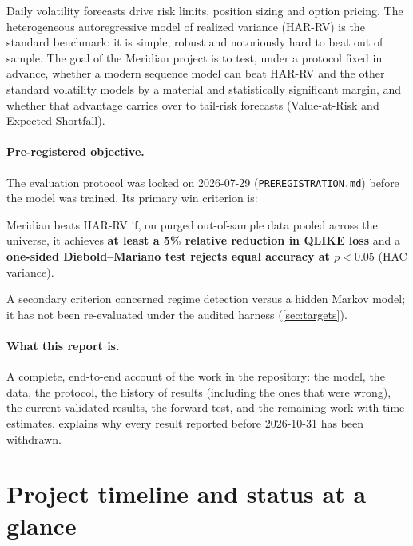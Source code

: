 \documentclass[11pt,a4paper]{article}
\begin{document}
Daily volatility forecasts drive risk limits, position sizing and option pricing. The
heterogeneous autoregressive model of realized variance (HAR-RV) \cite{corsi2009} is the standard
benchmark: it is simple, robust and notoriously hard to beat out of sample. The goal of the Meridian
project is to test, under a protocol fixed in advance, whether a modern sequence model can beat
HAR-RV and the other standard volatility models by a material and statistically significant margin,
and whether that advantage carries over to tail-risk forecasts (Value-at-Risk and Expected Shortfall).

\paragraph{Pre-registered objective.} The evaluation protocol was locked on 2026-07-29
(\texttt{PREREGISTRATION.md}) before the model was trained. Its primary win criterion is:
\begin{keybox}
Meridian beats HAR-RV if, on purged out-of-sample data pooled across the universe, it achieves
\textbf{at least a 5\% relative reduction in QLIKE loss} and a \textbf{one-sided Diebold--Mariano test
rejects equal accuracy at $p<0.05$} (HAC variance).
\end{keybox}
A secondary criterion concerned regime detection versus a hidden Markov model; it has not been
re-evaluated under the audited harness (\cref{sec:targets}).

\paragraph{What this report is.} A complete, end-to-end account of the work in the repository: the
model, the data, the protocol, the history of results (including the ones that were wrong), the
current validated results, the forward test, and the remaining work with time estimates.
 explains why every result reported before 2026-10-31 has been withdrawn.

\section{Project timeline and status at a glance}\label{sec:timeline}
\end{document}
